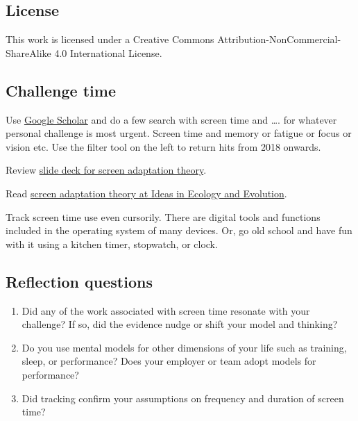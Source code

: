 \documentclass[
]{book}
\providecommand{\tightlist}{%
  \setlength{\itemsep}{0pt}\setlength{\parskip}{0pt}}
\begin{document}
\hypertarget{license}{%
\subsection*{License}\label{license}}

This work is licensed under a Creative Commons Attribution-NonCommercial-ShareAlike 4.0 International License.

\hypertarget{challenge-time}{%
\subsection*{Challenge time}\label{challenge-time}}

Use \href{https://scholar.google.com}{Google Scholar} and do a few search with screen time and \ldots. for whatever personal challenge is most urgent. Screen time and memory or fatigue or focus or vision etc. Use the filter tool on the left to return hits from 2018 onwards.

Review \href{https://figshare.com/articles/presentation/Screen_attention_theory/19686291}{slide deck for screen adaptation theory}.

Read \href{https://ojs.library.queensu.ca/index.php/IEE/article/view/15653}{screen adaptation theory at Ideas in Ecology and Evolution}.

Track screen time use even cursorily. There are digital tools and functions included in the operating system of many devices. Or, go old school and have fun with it using a kitchen timer, stopwatch, or clock.

\hypertarget{reflection-questions}{%
\subsection*{Reflection questions}\label{reflection-questions}}

\begin{enumerate}
\def\labelenumi{\arabic{enumi}.}
\tightlist
\item
  Did any of the work associated with screen time resonate with your challenge? If so, did the evidence nudge or shift your model and thinking?
\item
  Do you use mental models for other dimensions of your life such as training, sleep, or performance? Does your employer or team adopt models for performance?
\item
  Did tracking confirm your assumptions on frequency and duration of screen time?
\end{enumerate}
\end{document}
